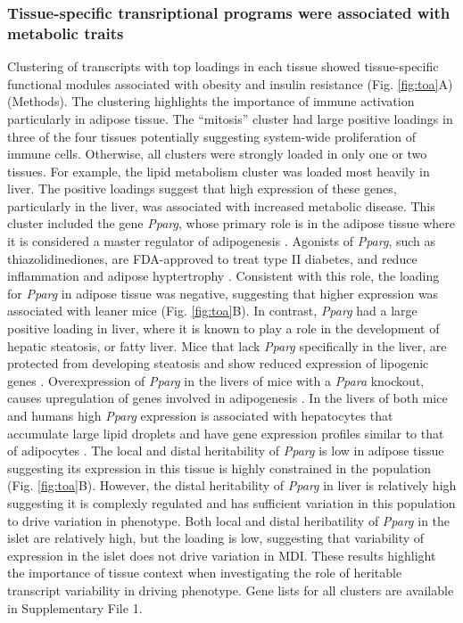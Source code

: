 \documentclass[
]{article}
\begin{document}
\subsubsection{Tissue-specific transriptional programs were associated
with metabolic
traits}\label{tissue-specific-transriptional-programs-were-associated-with-metabolic-traits}

Clustering of transcripts with top loadings in each tissue showed
tissue-specific functional modules associated with obesity and insulin
resistance (Fig. \ref{fig:toa}A) (Methods). The clustering highlights
the importance of immune activation particularly in adipose tissue. The
``mitosis'' cluster had large positive loadings in three of the four
tissues potentially suggesting system-wide proliferation of immune
cells. Otherwise, all clusters were strongly loaded in only one or two
tissues. For example, the lipid metabolism cluster was loaded most
heavily in liver. The positive loadings suggest that high expression of
these genes, particularly in the liver, was associated with increased
metabolic disease. This cluster included the gene \textit{Pparg}, whose
primary role is in the adipose tissue where it is considered a master
regulator of adipogenesis \cite{pmid17389767}. Agonists of
\textit{Pparg}, such as thiazolidinediones, are FDA-approved to treat
type II diabetes, and reduce inflammation and adipose hyptertrophy
\cite{pmid17389767}. Consistent with this role, the loading for
\textit{Pparg} in adipose tissue was negative, suggesting that higher
expression was associated with leaner mice (Fig. \ref{fig:toa}B). In
contrast, \textit{Pparg} had a large positive loading in liver, where it
is known to play a role in the development of hepatic steatosis, or
fatty liver. Mice that lack \textit{Pparg} specifically in the liver,
are protected from developing steatosis and show reduced expression of
lipogenic genes \cite{pmid12805374, pmid12618528}. Overexpression of
\textit{Pparg} in the livers of mice with a \textit{Ppara} knockout,
causes upregulation of genes involved in adipogenesis
\cite{pmid16357043}. In the livers of both mice and humans high
\textit{Pparg} expression is associated with hepatocytes that accumulate
large lipid droplets and have gene expression profiles similar to that
of adipocytes \cite{pmid15644454, pmid16403437}. The local and distal
heritability of \textit{Pparg} is low in adipose tissue suggesting its
expression in this tissue is highly constrained in the population (Fig.
\ref{fig:toa}B). However, the distal heritability of \textit{Pparg} in
liver is relatively high suggesting it is complexly regulated and has
sufficient variation in this population to drive variation in phenotype.
Both local and distal heribatility of \textit{Pparg} in the islet are
relatively high, but the loading is low, suggesting that variability of
expression in the islet does not drive variation in MDI. These results
highlight the importance of tissue context when investigating the role
of heritable transcript variability in driving phenotype. Gene lists for
all clusters are available in Supplementary File 1.
\end{document}
